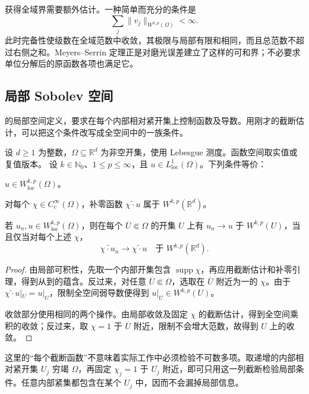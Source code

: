 获得全域界需要额外估计。一种简单而充分的条件是
\[
 \sum_j\|v_j\|_{W^{k,p}(\Omega)}<\infty.
\]
此时完备性使级数在全域范数中收敛，其极限与局部有限和相同，而且总范数不超过右侧之和。Meyers--Serrin 定理正是对磨光误差建立了这样的可和界；不必要求单位分解后的原函数各项也满足它。

\subsection{局部 Sobolev 空间}
\label{b1:subsec:220403}

的局部空间定义，要求在每个内部相对紧开集上控制函数及导数。用刚才的截断估计，可以把这个条件改写成全空间中的一族条件。

\begin{proposition}\label{b1:prop:local-sobolev-cutoff-characterization}
设 \(d\geq1\) 为整数，\(\Omega\subseteq\mathbb R^d\) 为非空开集，使用 Lebesgue 测度。函数空间取实值或复值版本。
设 \(k\in\mathbb N_0\)、\(1\le p\le\infty\)，且 \(u\in L^1_{\mathrm{loc}}(\Omega)\)。下列条件等价：
\begin{equivalences}
\item\label{b1:item:local-sobolev-membership}
\(u\in W^{k,p}_{\mathrm{loc}}(\Omega)\)。
\item\label{b1:item:all-sobolev-cutoffs}
对每个 \(\chi\in C_c^\infty(\Omega)\)，补零函数 \(\widetilde{\chi\cdot u}\) 属于 \(W^{k,p}(\mathbb R^d)\)。
\end{equivalences}
若 \(u_n,u\in W^{k,p}_{\mathrm{loc}}(\Omega)\)，则在每个 \(\overline U\Subset\Omega\) 的开集 \(U\) 上有 \(u_n\to u\) 于 \(W^{k,p}(U)\)，当且仅当对每个上述 \(\chi\)，
\[
 \widetilde{\chi\cdot u_n}\longrightarrow\widetilde{\chi\cdot u}
 \quad\text{于 }W^{k,p}(\mathbb R^d).
\]
\end{proposition}
\begin{proof}
由局部可积性，先取一个内部开集包含 \(\operatorname{supp}\chi\)，再应用截断估计和补零引理，得到从到的蕴含。反过来，对任意 \(\overline U\Subset\Omega\)，选取在 \(\overline U\) 附近为一的 \(\chi\)。由于 \(\widetilde{\chi\cdot u}|_U=u|_U\)，限制全空间弱导数便得到 \(u|_U\in W^{k,p}(U)\)。

收敛部分使用相同的两个操作。由局部收敛及固定 \(\chi\) 的截断估计，得到全空间乘积的收敛；反过来，取 \(\chi=1\) 于 \(\overline U\) 附近，限制不会增大范数，故得到 \(U\) 上的收敛。
\end{proof}

这里的“每个截断函数”不意味着实际工作中必须检验不可数多项。取递增的内部相对紧开集 \(U_j\) 穷竭 \(\Omega\)，再固定 \(\chi_j=1\) 于 \(\overline{U_j}\) 附近，即可只用这一列截断检验局部条件。任意内部紧集都包含在某个 \(U_j\) 中，因而不会漏掉局部信息。


